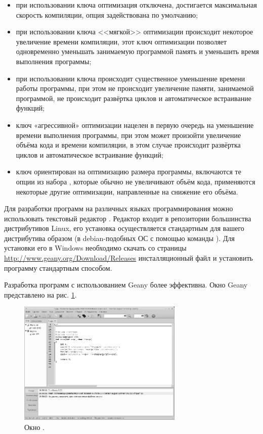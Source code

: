 \begin{itemize}
\item при использовании ключа  оптимизация отключена, достигается максимальная скорость компиляции, опция
задействована по умолчанию;
\item при использовании ключа <<мягкой>> оптимизации  происходит некоторое увеличение времени
компиляции, этот ключ оптимизации позволяет одновременно уменьшать занимаемую программой память и уменьшить время
выполнения программы;
\item при использовании ключа  происходит существенное уменьшение времени работы программы, при этом не
происходит увеличение памяти, занимаемой программой, не происходит развёртка циклов и автоматическое встраивание
функций;
\item ключ «агрессивной» оптимизации  нацелен в первую очередь на уменьшение времени выполнения программы,
при этом может произойти увеличение объёма кода и времени компиляции, в этом случае происходит развёртка циклов и
автоматическое встраивание функций;
\item ключ  ориентирован на оптимизацию размера программы, включаются те опции из набора ,
которые обычно не увеличивают объём кода, применяются некоторые другие оптимизации, направленные на снижение его
объёма.
\end{itemize}

Для разработки программ на различных языках программирования можно использовать текстовый редактор . 
Редактор  входит в репозитории большинства дистрибутивов Linux, его установка осуществляется 
стандартным для вашего дистрибутива
образом (в debian-подобных ОС с помощью команды ). Для установки его в Windows необходимо
скачать со страницы \url{http://www.geany.org/Download/Releases} инсталляционный файл и установить программу стандартным
способом.

Разработка программ с использованием Geany более эффективна. Окно Geany представлено на рис. \ref{app:refDrawing5}. 

\begin{figure}[htb]
\begin{center}
\includegraphics[width=0.7\textwidth]{img/ris_app_6}
\caption[Окно .]{Окно .}
\label{app:refDrawing5}
\end{center}
\end{figure}


